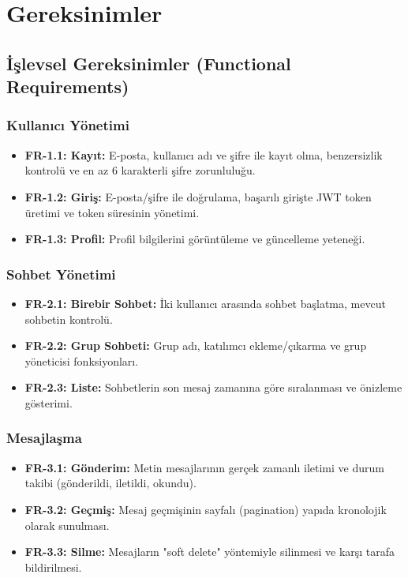 \chapter{Gereksinimler}

\section{İşlevsel Gereksinimler (Functional Requirements)}

\subsection{Kullanıcı Yönetimi}
\begin{itemize}
    \item \textbf{FR-1.1: Kayıt:} E-posta, kullanıcı adı ve şifre ile kayıt olma, benzersizlik kontrolü ve en az 6 karakterli şifre zorunluluğu.
    \item \textbf{FR-1.2: Giriş:} E-posta/şifre ile doğrulama, başarılı girişte JWT token üretimi ve token süresinin yönetimi.
    \item \textbf{FR-1.3: Profil:} Profil bilgilerini görüntüleme ve güncelleme yeteneği.
\end{itemize}

\subsection{Sohbet Yönetimi}
\begin{itemize}
    \item \textbf{FR-2.1: Birebir Sohbet:} İki kullanıcı arasında sohbet başlatma, mevcut sohbetin kontrolü.
    \item \textbf{FR-2.2: Grup Sohbeti:} Grup adı, katılımcı ekleme/çıkarma ve grup yöneticisi fonksiyonları.
    \item \textbf{FR-2.3: Liste:} Sohbetlerin son mesaj zamanına göre sıralanması ve önizleme gösterimi.
\end{itemize}

\subsection{Mesajlaşma}
\begin{itemize}
    \item \textbf{FR-3.1: Gönderim:} Metin mesajlarının gerçek zamanlı iletimi ve durum takibi (gönderildi, iletildi, okundu).
    \item \textbf{FR-3.2: Geçmiş:} Mesaj geçmişinin sayfalı (pagination) yapıda kronolojik olarak sunulması.
    \item \textbf{FR-3.3: Silme:} Mesajların "soft delete" yöntemiyle silinmesi ve karşı tarafa bildirilmesi.
\end{itemize}

